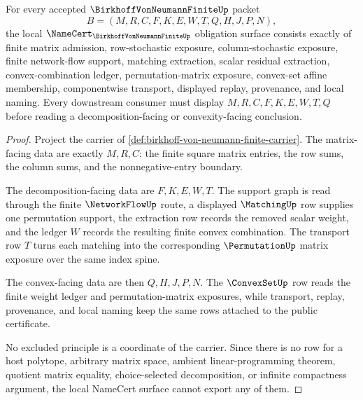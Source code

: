 \begin{theorem}
\label{thm:birkhoff-von-neumann-namecert-obligations}
For every accepted $\BirkhoffVonNeumannFiniteUp$ packet
$$
B=(M,R,C,F,K,E,W,T,Q,H,J,P,N),
$$
the local $\NameCert_{\BirkhoffVonNeumannFiniteUp}$ obligation surface consists exactly of finite matrix admission, row-stochastic exposure, column-stochastic exposure, finite network-flow support, matching extraction, scalar residual extraction, convex-combination ledger, permutation-matrix exposure, convex-set affine membership, componentwise transport, displayed replay, provenance, and local naming. Every downstream consumer must display $M,R,C,F,K,E,W,T,Q$ before reading a decomposition-facing or convexity-facing conclusion.
\end{theorem}
\begin{proof}
Project the carrier of \autoref{def:birkhoff-von-neumann-finite-carrier}. The matrix-facing data are exactly $M,R,C$: the finite square matrix entries, the row sums, the column sums, and the nonnegative-entry boundary.

The decomposition-facing data are $F,K,E,W,T$. The support graph is read through the finite $\NetworkFlowUp$ route, a displayed $\MatchingUp$ row supplies one permutation support, the extraction row records the removed scalar weight, and the ledger $W$ records the resulting finite convex combination. The transport row $T$ turns each matching into the corresponding $\PermutationUp$ matrix exposure over the same index spine.

The convex-facing data are then $Q,H,J,P,N$. The $\ConvexSetUp$ row reads the finite weight ledger and permutation-matrix exposures, while transport, replay, provenance, and local naming keep the same rows attached to the public certificate.

No excluded principle is a coordinate of the carrier. Since there is no row for a host polytope, arbitrary matrix space, ambient linear-programming theorem, quotient matrix equality, choice-selected decomposition, or infinite compactness argument, the local NameCert surface cannot export any of them.
\end{proof}

